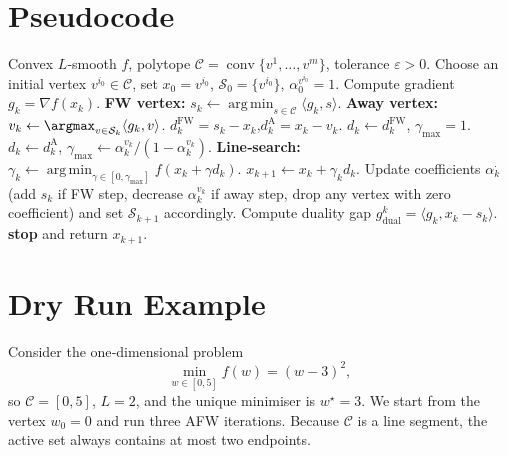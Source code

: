 \documentclass{article}
\newcommand{\C}{\mathcal{C}}
\newcommand{\conv}{\operatorname{conv}}
\newcommand{\argmin}{\operatorname*{arg\,min}}
\begin{document}
\section*{Pseudocode}
\begin{algorithm}[H]
\caption{Away‑Step Frank‑Wolfe (AFW)}
\begin{algorithmic}[1]
\Require Convex $L$‑smooth $f$, polytope $\C=\conv\{v^{1},\dots ,v^{m}\}$, tolerance $\varepsilon>0$.
\State Choose an initial vertex $v^{i_{0}}\in\C$, set $x_{0}=v^{i_{0}}$, $\mathcal{S}_{0}=\{v^{i_{0}}\}$, $\alpha_{0}^{v^{i_{0}}}=1$.
    \State Compute gradient $g_{k}=\nabla f(x_{k})$.
    \State \textbf{FW vertex:}\; $s_{k}\gets\argmin_{s\in\C}\langle g_{k},s\rangle$.
    \State \textbf{Away vertex:}\; $v_{k}\gets\argmax_{v\in\mathcal{S}_{k}}\langle g_{k},v\rangle$.
    \State $d^{\text{FW}}_{k}=s_{k}-x_{k}$,\quad $d^{\text{A}}_{k}=x_{k}-v_{k}$.
        \State $d_{k}\gets d^{\text{FW}}_{k}$,\; $\gamma_{\max}=1$.
    \Else
        \State $d_{k}\gets d^{\text{A}}_{k}$,\;
        $\gamma_{\max}\gets \alpha_{k}^{v_{k}}/(1-\alpha_{k}^{v_{k}})$.
    \EndIf
    \State \textbf{Line‑search:} $\displaystyle\gamma_{k}\gets\argmin_{\gamma\in[0,\gamma_{\max}]} f(x_{k}+\gamma d_{k})$.
    \State $x_{k+1}\gets x_{k}+\gamma_{k}d_{k}$.
    \State Update coefficients $\alpha_{k}^{\cdot}$ (add $s_{k}$ if FW step, decrease $\alpha_{k}^{v_{k}}$ if away step, drop any vertex with zero coefficient) and set $\mathcal{S}_{k+1}$ accordingly.
    \State Compute duality gap $g_{\text{dual}}^{k}= \langle g_{k},x_{k}-s_{k}\rangle$.
        \State \textbf{stop} and return $x_{k+1}$.
    \EndIf
\EndFor
\end{algorithmic}
\end{algorithm}

\section*{Dry Run Example}
Consider the one‑dimensional problem
\[
\min_{w\in[0,5]} f(w)=(w-3)^{2},
\]
so $\C=[0,5]$, $L=2$, and the unique minimiser is $w^{\star}=3$.
We start from the vertex $w_{0}=0$ and run three AFW iterations.  
Because $\C$ is a line segment, the active set always contains at most two endpoints.
\end{document}
